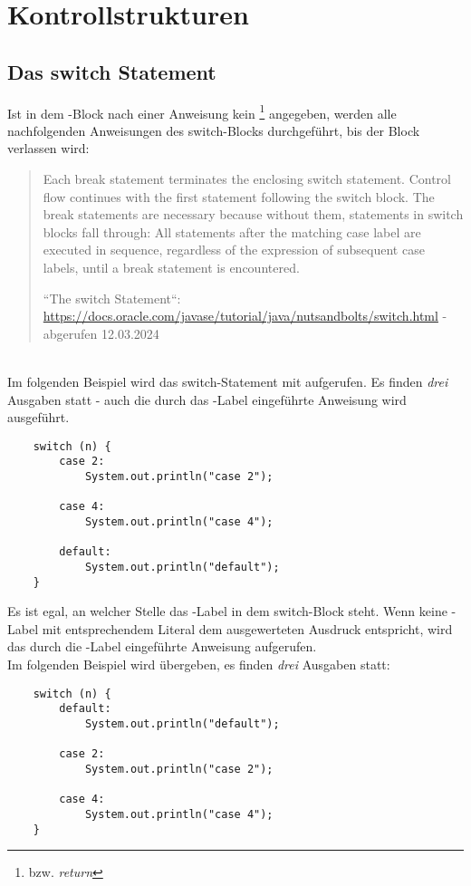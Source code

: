 \section{Kontrollstrukturen}


\subsection{Das switch Statement}

Ist in dem -Block nach einer Anweisung kein \footnote{bzw. \textit{return}} angegeben, werden alle nachfolgenden Anweisungen des switch-Blocks durchgeführt, bis der Block verlassen wird:

\blockquote[{``The switch Statement``: \url{https://docs.oracle.com/javase/tutorial/java/nutsandbolts/switch.html} - abgerufen 12.03.2024}]{
    Each break statement terminates the enclosing switch statement. Control flow continues with the first statement following the switch block. The break statements are necessary because without them, statements in switch blocks fall through: All statements after the matching case label are executed in sequence, regardless of the expression of subsequent case labels, until a break statement is encountered.
}\\

\noindent
Im folgenden Beispiel wird das switch-Statement mit  aufgerufen.
Es finden \textit{drei} Ausgaben statt - auch die durch das -Label eingeführte Anweisung wird ausgeführt.

\begin{verbatim}
    switch (n) {
        case 2:
            System.out.println("case 2");

        case 4:
            System.out.println("case 4");

        default:
            System.out.println("default");
    }
\end{verbatim}


\noindent
Es ist egal, an welcher Stelle das -Label in dem switch-Block steht.
Wenn keine -Label mit entsprechendem Literal dem ausgewerteten Ausdruck entspricht, wird das durch die -Label eingeführte Anweisung aufgerufen.\\

\noindent
Im folgenden Beispiel wird  übergeben, es finden \textit{drei} Ausgaben statt:

\begin{verbatim}
    switch (n) {
        default:
            System.out.println("default");

        case 2:
            System.out.println("case 2");

        case 4:
            System.out.println("case 4");
    }
\end{verbatim}
